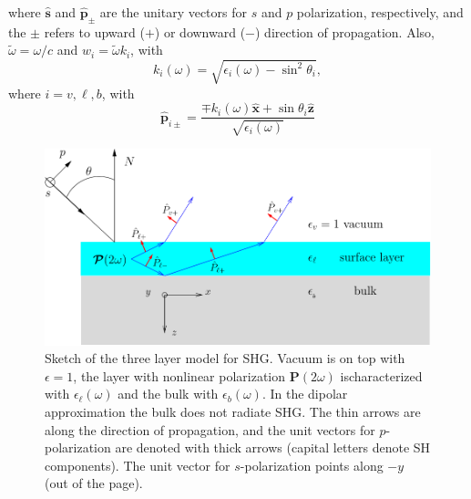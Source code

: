 \documentclass[10pt]{article}
\begin{document}
where $\hat{\mathbf{s}}$ and $\hat{\mathbf{p}}_\pm$ are the unitary vectors for
$s$ and $p$ polarization, respectively, and the $\pm$ refers to upward ($+$) or
downward ($-$) direction of propagation. Also, $\tilde\omega=\omega/c$ and
$w_i=\tilde\omega k_i$, with
\begin{equation}\label{r3}
k_i(\omega)=\sqrt{\epsilon_i(\omega) - \sin^2\theta_i},
\end{equation}
where $i=v,\ell,b$, with
\begin{equation}\label{r4}
\hat{\mathbf{p}}_{i\pm} =
\frac{\mp k_i(\omega)\hat{\mathbf{x}} + \sin\theta_i\hat{\mathbf{z}}}
{\sqrt{\epsilon_i(\omega)}}
\end{equation}
\begin{figure}[t]
\centering
\includegraphics[scale=.5]{figures/3layers}
\caption{Sketch of the three layer model for SHG. Vacuum is on top with
$\epsilon=1$, the layer with nonlinear polarization $\mathbf{P}(2\omega)$
ischaracterized with $\epsilon_{\ell}(\omega)$ and the bulk with
$\epsilon_{b}(\omega)$. In the dipolar approximation the bulk does not radiate
SHG. The thin arrows are along the direction of propagation, and the unit
vectors for $p$-polarization are denoted with thick arrows (capital letters
denote SH components). The unit vector for $s$-polarization points along $-y$
(out of the page).}
\label{3layer}
\end{figure}
\end{document}
